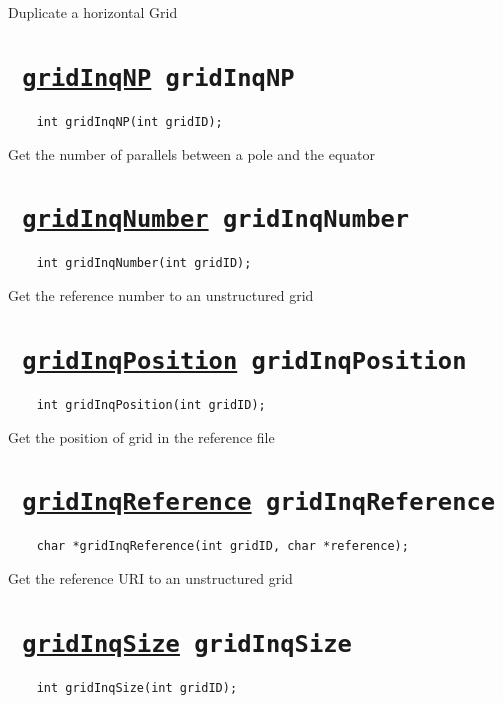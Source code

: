 Duplicate a horizontal Grid
\ifpdfoutput{}{(\ref{gridDuplicate})}


\section*{\tt 
\ifpdf
\hyperref[gridInqNP]{gridInqNP}
\else
gridInqNP
\fi
}
\begin{verbatim}
    int gridInqNP(int gridID);
\end{verbatim}

Get the number of parallels between a pole and the equator
\ifpdfoutput{}{(\ref{gridInqNP})}


\section*{\tt 
\ifpdf
\hyperref[gridInqNumber]{gridInqNumber}
\else
gridInqNumber
\fi
}
\begin{verbatim}
    int gridInqNumber(int gridID);
\end{verbatim}

Get the reference number to an unstructured grid
\ifpdfoutput{}{(\ref{gridInqNumber})}


\section*{\tt 
\ifpdf
\hyperref[gridInqPosition]{gridInqPosition}
\else
gridInqPosition
\fi
}
\begin{verbatim}
    int gridInqPosition(int gridID);
\end{verbatim}

Get the position of grid in the reference file
\ifpdfoutput{}{(\ref{gridInqPosition})}


\section*{\tt 
\ifpdf
\hyperref[gridInqReference]{gridInqReference}
\else
gridInqReference
\fi
}
\begin{verbatim}
    char *gridInqReference(int gridID, char *reference);
\end{verbatim}

Get the reference URI to an unstructured grid
\ifpdfoutput{}{(\ref{gridInqReference})}


\section*{\tt 
\ifpdf
\hyperref[gridInqSize]{gridInqSize}
\else
gridInqSize
\fi
}
\begin{verbatim}
    int gridInqSize(int gridID);
\end{verbatim}

